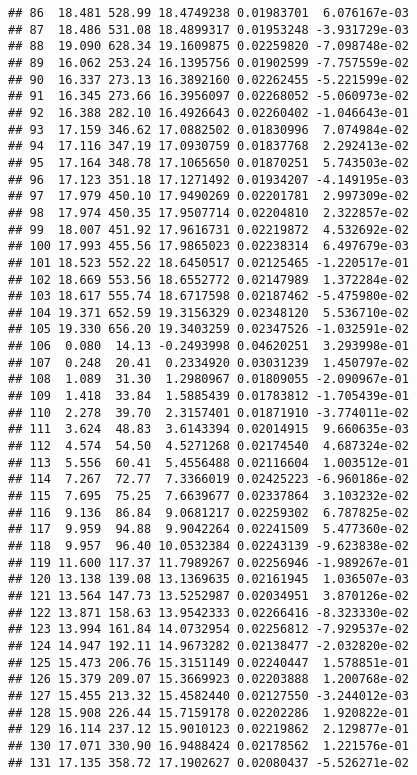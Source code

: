 \documentclass[]{book}
\theoremstyle{definition}
\theoremstyle{definition}
\theoremstyle{definition}
\theoremstyle{remark}
\begin{document}
\begin{verbatim}
## 86  18.481 528.99 18.4749238 0.01983701  6.076167e-03
## 87  18.486 531.08 18.4899317 0.01953248 -3.931729e-03
## 88  19.090 628.34 19.1609875 0.02259820 -7.098748e-02
## 89  16.062 253.24 16.1395756 0.01902599 -7.757559e-02
## 90  16.337 273.13 16.3892160 0.02262455 -5.221599e-02
## 91  16.345 273.66 16.3956097 0.02268052 -5.060973e-02
## 92  16.388 282.10 16.4926643 0.02260402 -1.046643e-01
## 93  17.159 346.62 17.0882502 0.01830996  7.074984e-02
## 94  17.116 347.19 17.0930759 0.01837768  2.292413e-02
## 95  17.164 348.78 17.1065650 0.01870251  5.743503e-02
## 96  17.123 351.18 17.1271492 0.01934207 -4.149195e-03
## 97  17.979 450.10 17.9490269 0.02201781  2.997309e-02
## 98  17.974 450.35 17.9507714 0.02204810  2.322857e-02
## 99  18.007 451.92 17.9616731 0.02219872  4.532692e-02
## 100 17.993 455.56 17.9865023 0.02238314  6.497679e-03
## 101 18.523 552.22 18.6450517 0.02125465 -1.220517e-01
## 102 18.669 553.56 18.6552772 0.02147989  1.372284e-02
## 103 18.617 555.74 18.6717598 0.02187462 -5.475980e-02
## 104 19.371 652.59 19.3156329 0.02348120  5.536710e-02
## 105 19.330 656.20 19.3403259 0.02347526 -1.032591e-02
## 106  0.080  14.13 -0.2493998 0.04620251  3.293998e-01
## 107  0.248  20.41  0.2334920 0.03031239  1.450797e-02
## 108  1.089  31.30  1.2980967 0.01809055 -2.090967e-01
## 109  1.418  33.84  1.5885439 0.01783812 -1.705439e-01
## 110  2.278  39.70  2.3157401 0.01871910 -3.774011e-02
## 111  3.624  48.83  3.6143394 0.02014915  9.660635e-03
## 112  4.574  54.50  4.5271268 0.02174540  4.687324e-02
## 113  5.556  60.41  5.4556488 0.02116604  1.003512e-01
## 114  7.267  72.77  7.3366019 0.02425223 -6.960186e-02
## 115  7.695  75.25  7.6639677 0.02337864  3.103232e-02
## 116  9.136  86.84  9.0681217 0.02259302  6.787825e-02
## 117  9.959  94.88  9.9042264 0.02241509  5.477360e-02
## 118  9.957  96.40 10.0532384 0.02243139 -9.623838e-02
## 119 11.600 117.37 11.7989267 0.02256946 -1.989267e-01
## 120 13.138 139.08 13.1369635 0.02161945  1.036507e-03
## 121 13.564 147.73 13.5252987 0.02034951  3.870126e-02
## 122 13.871 158.63 13.9542333 0.02266416 -8.323330e-02
## 123 13.994 161.84 14.0732954 0.02256812 -7.929537e-02
## 124 14.947 192.11 14.9673282 0.02138477 -2.032820e-02
## 125 15.473 206.76 15.3151149 0.02240447  1.578851e-01
## 126 15.379 209.07 15.3669923 0.02203888  1.200768e-02
## 127 15.455 213.32 15.4582440 0.02127550 -3.244012e-03
## 128 15.908 226.44 15.7159178 0.02202286  1.920822e-01
## 129 16.114 237.12 15.9010123 0.02219862  2.129877e-01
## 130 17.071 330.90 16.9488424 0.02178562  1.221576e-01
## 131 17.135 358.72 17.1902627 0.02080437 -5.526271e-02

\end{verbatim}
\end{document}
